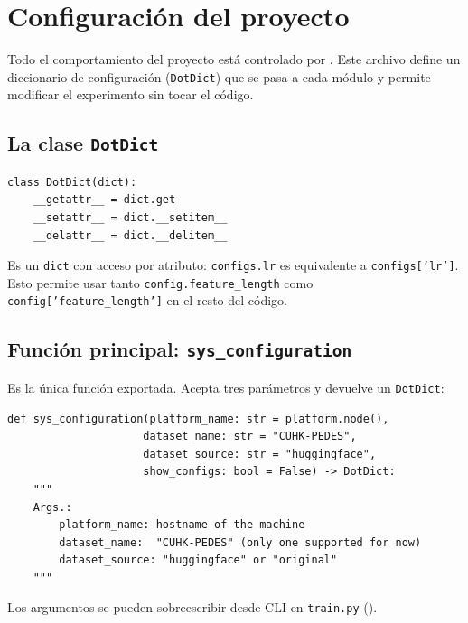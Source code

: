 \chapter{Configuración del proyecto}
\label{cap:configuracion}

Todo el comportamiento del proyecto está controlado por
. Este archivo define un diccionario de
configuración (\texttt{DotDict}) que se pasa a cada módulo y
permite modificar el experimento sin tocar el código.

\section{La clase \texttt{DotDict}}

\begin{verbatim}
class DotDict(dict):
    __getattr__ = dict.get
    __setattr__ = dict.__setitem__
    __delattr__ = dict.__delitem__
\end{verbatim}

\noindent Es un \texttt{dict} con acceso por atributo:
\texttt{configs.lr} es equivalente a \texttt{configs['lr']}.
Esto permite usar tanto \texttt{config.feature\_length} como
\texttt{config['feature\_length']} en el resto del código.

\section{Función principal: \texttt{sys\_configuration}}

Es la única función exportada. Acepta tres parámetros y devuelve
un \texttt{DotDict}:

\begin{verbatim}
def sys_configuration(platform_name: str = platform.node(),
                     dataset_name: str = "CUHK-PEDES",
                     dataset_source: str = "huggingface",
                     show_configs: bool = False) -> DotDict:
    """
    Args.:
        platform_name: hostname of the machine
        dataset_name:  "CUHK-PEDES" (only one supported for now)
        dataset_source: "huggingface" or "original"
    """
\end{verbatim}

\noindent Los argumentos se pueden sobreescribir desde CLI en
\texttt{train.py} ().

